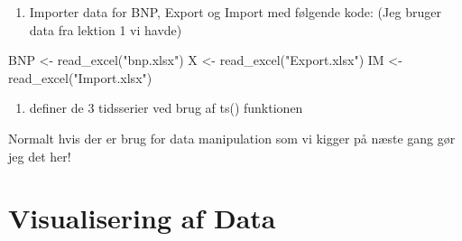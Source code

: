 \documentclass[
  12pt,
]{article}
\newenvironment{Shaded}{\begin{snugshade}}{\end{snugshade}}
\newcommand{\AttributeTok}[1]{\textcolor[rgb]{0.77,0.63,0.00}{#1}}
\newcommand{\DecValTok}[1]{\textcolor[rgb]{0.00,0.00,0.81}{#1}}
\newcommand{\FunctionTok}[1]{\textcolor[rgb]{0.00,0.00,0.00}{#1}}
\newcommand{\NormalTok}[1]{#1}
\newcommand{\OtherTok}[1]{\textcolor[rgb]{0.56,0.35,0.01}{#1}}
\newcommand{\SpecialCharTok}[1]{\textcolor[rgb]{0.00,0.00,0.00}{#1}}
\newcommand{\StringTok}[1]{\textcolor[rgb]{0.31,0.60,0.02}{#1}}
\providecommand{\tightlist}{%
  \setlength{\itemsep}{0pt}\setlength{\parskip}{0pt}}
\begin{document}
\begin{enumerate}
\def\labelenumi{\arabic{enumi}.}
\tightlist
\item
  Importer data for BNP, Export og Import med følgende kode: (Jeg bruger
  data fra lektion 1 vi havde)
\end{enumerate}

\begin{Shaded}
\begin{Highlighting}[]
\NormalTok{BNP }\OtherTok{\textless{}{-}} \FunctionTok{read\_excel}\NormalTok{(}\StringTok{"bnp.xlsx"}\NormalTok{)}
\NormalTok{X }\OtherTok{\textless{}{-}} \FunctionTok{read\_excel}\NormalTok{(}\StringTok{"Export.xlsx"}\NormalTok{)}
\NormalTok{IM }\OtherTok{\textless{}{-}} \FunctionTok{read\_excel}\NormalTok{(}\StringTok{"Import.xlsx"}\NormalTok{)}
\end{Highlighting}
\end{Shaded}

\begin{enumerate}
\def\labelenumi{\arabic{enumi}.}
\setcounter{enumi}{1}
\tightlist
\item
  definer de 3 tidsserier ved brug af ts() funktionen
\end{enumerate}

\begin{Shaded}
\end{Shaded}

Normalt hvis der er brug for data manipulation som vi kigger på næste
gang gør jeg det her!

\hypertarget{visualisering-af-data}{%
\section{Visualisering af Data}\label{visualisering-af-data}}
\end{document}
